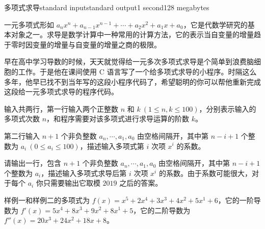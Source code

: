 \begin{problem}{多项式求导}{standard input}{standard output}{1 second}{128 megabytes}

    一元多项式形如 $a_nx^n+a_{n-1}x^{n-1}+\cdots+a_2x^2+a_1x+a_0​$，它是代数学研究的基本对象之一。求导是数学计算中一种常用的计算方法，它的表示当自变量的增量趋于零时因变量的增量与自变量的增量之商的极限。

    早在高中学习导数的时候，天天就觉得给一元多次多项式求导是个简单到浪费脑细胞的工作。于是他在课间使用 C 语言写了一个给多项式求导的小程序。时隔这么多年，他早已找不到当年写的这段小程序代码了，希望聪明的你可以帮他重新完成这段给一元多项式求导的程序代码。

    \InputFile
    
    输入共两行，第一行输入两个正整数 $n$ 和 $k\ (1\le n,k\le 100)$，分别表示输入的多项式次数 $n$，和程序需要对该多项式进行求导运算的阶数 $k$。

    第二行输入 $n+1$ 个非负整数 $a_n,\cdots ,a_1,a_0$ 由空格间隔开，其中第 $n-i+1$ 个整数为 $a_i\ (0\le a_i\le 100)$，描述输入多项式第 $i$ 次项 $x^{i}$ 的系数。
    
    \OutputFile
    
    请输出一行，包含 $n+1$ 个非负整数 $a_n,\cdots ,a_1,a_0$ 由空格间隔开，其中第 $n-i+1$ 个整数为 $a_i$，描述输入多项式求导后第 $i$ 次项 $x^i$ 的系数。由于系数可能很大，对于每个 $a_i$ 你只需要输出它取模 $2019$ 之后的答案。
    
    \Example
    
    \begin{example}
    \end{example}

    \Explanation

    样例一和样例二的多项式为 $f(x)=x^5+2x^4+3x^3+4x^2+5x^1+6$，它的一阶导数为 $f'(x)=5x^4+8x^3+9x^2+8x^1+5$，它的二阶导数为 $f''(x)=20x^3+24x^2+18x+8$。

\end{problem}